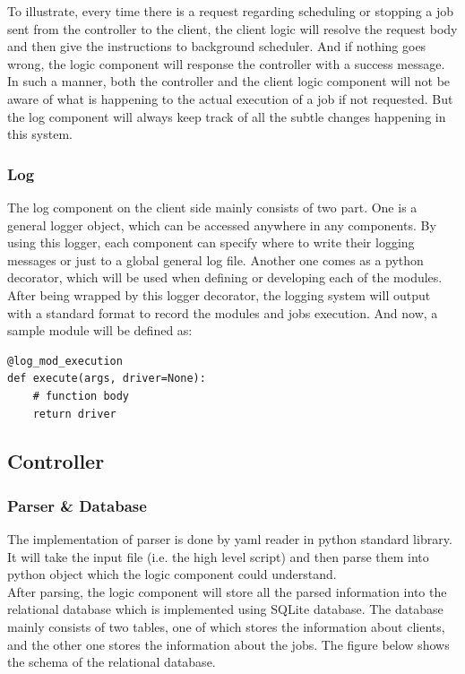 \documentclass[12pt]{report}
\begin{document}
To illustrate, every time there is a request regarding scheduling or stopping a job sent from the controller to the client, the client logic will resolve the request body and then give the instructions to background scheduler. And if nothing goes wrong, the logic component will response the controller with a success message.\\

In such a manner, both the controller and the client logic component will not be aware of what is happening to the actual execution of a job if not requested. But the log component will always keep track of all the subtle changes happening in this system.


\subsubsection{Log}
The log component on the client side mainly consists of two part. One is a general logger object, which can be accessed anywhere in any components. By using this logger, each component can specify where to write their logging messages or just to a global general log file. Another one comes as a python decorator, which will be used when defining or developing each of the modules. After being wrapped by this logger decorator, the logging system will output with a standard format to record the modules and jobs execution. And now, a sample module will be defined as:

\begin{lstlisting}
@log_mod_execution
def execute(args, driver=None):
    # function body
    return driver
\end{lstlisting}

\subsection{Controller}
\subsubsection{Parser \& Database}
The implementation of parser is done by yaml reader in python standard library. It will take the input file (i.e. the high level script) and then parse them into python object which the logic component could understand.\\

After parsing, the logic component will store all the parsed information into the relational database which is implemented using SQLite database. The database mainly consists of two tables, one of which stores the information about clients, and the other one stores the information about the jobs. The figure below shows the schema of the relational database.
\end{document}
